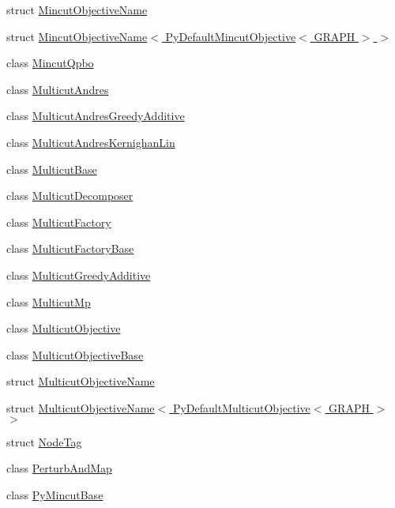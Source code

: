 \begin{DoxyCompactItemize}
\item 
struct \hyperlink{structnifty_1_1graph_1_1MincutObjectiveName}{Mincut\+Objective\+Name}
\item 
struct \hyperlink{structnifty_1_1graph_1_1MincutObjectiveName_3_01PyDefaultMincutObjective_3_01GRAPH_01_4_01_4}{Mincut\+Objective\+Name$<$ Py\+Default\+Mincut\+Objective$<$ G\+R\+A\+P\+H $>$ $>$}
\item 
class \hyperlink{classnifty_1_1graph_1_1MincutQpbo}{Mincut\+Qpbo}
\item 
class \hyperlink{classnifty_1_1graph_1_1MulticutAndres}{Multicut\+Andres}
\item 
class \hyperlink{classnifty_1_1graph_1_1MulticutAndresGreedyAdditive}{Multicut\+Andres\+Greedy\+Additive}
\item 
class \hyperlink{classnifty_1_1graph_1_1MulticutAndresKernighanLin}{Multicut\+Andres\+Kernighan\+Lin}
\item 
class \hyperlink{classnifty_1_1graph_1_1MulticutBase}{Multicut\+Base}
\item 
class \hyperlink{classnifty_1_1graph_1_1MulticutDecomposer}{Multicut\+Decomposer}
\item 
class \hyperlink{classnifty_1_1graph_1_1MulticutFactory}{Multicut\+Factory}
\item 
class \hyperlink{classnifty_1_1graph_1_1MulticutFactoryBase}{Multicut\+Factory\+Base}
\item 
class \hyperlink{classnifty_1_1graph_1_1MulticutGreedyAdditive}{Multicut\+Greedy\+Additive}
\item 
class \hyperlink{classnifty_1_1graph_1_1MulticutMp}{Multicut\+Mp}
\item 
class \hyperlink{classnifty_1_1graph_1_1MulticutObjective}{Multicut\+Objective}
\item 
class \hyperlink{classnifty_1_1graph_1_1MulticutObjectiveBase}{Multicut\+Objective\+Base}
\item 
struct \hyperlink{structnifty_1_1graph_1_1MulticutObjectiveName}{Multicut\+Objective\+Name}
\item 
struct \hyperlink{structnifty_1_1graph_1_1MulticutObjectiveName_3_01PyDefaultMulticutObjective_3_01GRAPH_01_4_01_4}{Multicut\+Objective\+Name$<$ Py\+Default\+Multicut\+Objective$<$ G\+R\+A\+P\+H $>$ $>$}
\item 
struct \hyperlink{structnifty_1_1graph_1_1NodeTag}{Node\+Tag}
\item 
class \hyperlink{classnifty_1_1graph_1_1PerturbAndMap}{Perturb\+And\+Map}
\item 
class \hyperlink{classnifty_1_1graph_1_1PyMincutBase}{Py\+Mincut\+Base}

\end{DoxyCompactItemize}
